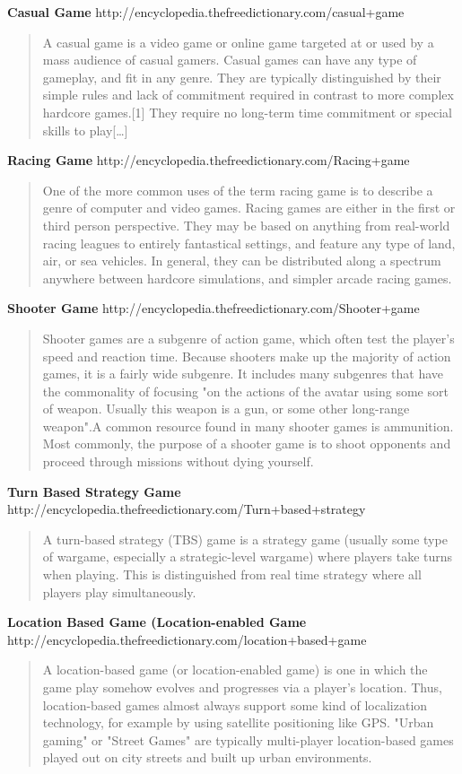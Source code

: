 \documentclass{article}
\begin{document}
\textbf{Casual Game}		
	http://encyclopedia.thefreedictionary.com/casual+game
\begin{quote}
A casual game is a video game or online game targeted at or used by a mass
audience of casual gamers. Casual games can have any type of gameplay, and fit
in any genre. They are typically distinguished by their simple rules and lack of
commitment required in contrast to more complex hardcore games.[1] They require
no long-term time commitment or special skills to play[\ldots]
\end{quote}

\textbf{Racing Game}
	http://encyclopedia.thefreedictionary.com/Racing+game
\begin{quote}
One of the more common uses of the term racing game is to describe a genre of
computer and video games. Racing games are either in the first or third person
perspective. They may be based on anything from real-world racing leagues to
entirely fantastical settings, and feature any type of land, air, or sea
vehicles. In general, they can be distributed along a spectrum anywhere between
hardcore simulations, and simpler arcade racing games.
\end{quote}
\textbf{Shooter Game}
	http://encyclopedia.thefreedictionary.com/Shooter+game
\begin{quote}
Shooter games are a subgenre of action game, which often test the player's speed
and reaction time. Because shooters make up the majority of action games, it is
a fairly wide subgenre. It includes many subgenres that have the commonality of
focusing "on the actions of the avatar using some sort of weapon. Usually this
weapon is a gun, or some other long-range weapon".A common resource found in
many shooter games is ammunition. Most commonly, the purpose of a shooter
game is to shoot opponents and proceed through missions without dying yourself.
\end{quote}
	
\textbf{Turn Based Strategy Game}
	http://encyclopedia.thefreedictionary.com/Turn+based+strategy
\begin{quote}
A turn-based strategy (TBS) game is a strategy game (usually some type of
wargame, especially a strategic-level wargame) where players take turns when
playing. This is distinguished from real time strategy where all players play
simultaneously.
\end{quote}

\textbf{Location Based Game (Location-enabled Game}
	http://encyclopedia.thefreedictionary.com/location+based+game
\begin{quote}
A location-based game (or location-enabled game) is one in which the game play
somehow evolves and progresses via a player's location. Thus, location-based
games almost always support some kind of localization technology, for example by
using satellite positioning like GPS. "Urban gaming" or "Street Games" are
typically multi-player location-based games played out on city streets and built
up urban environments.
\end{quote}
\end{document}
